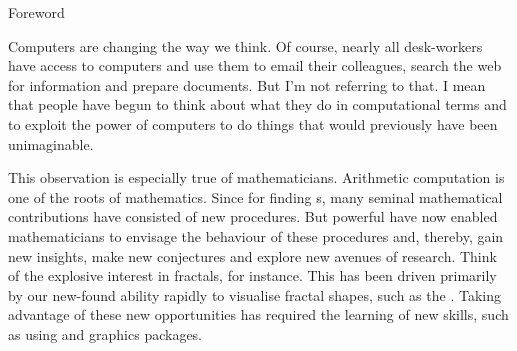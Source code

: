 
\begin{omgroup}{Foreword}

\begin{omtext}
Computers are changing the way we think. Of course, nearly all desk-workers have access to
computers and use them to email their colleagues, search the web for information and
prepare documents.  But I'm not referring to that. I mean that people have begun to think
about what they do in computational terms and to exploit the power of computers to do
things that would previously have been unimaginable.
\end{omtext}

\begin{omtext}
This observation is especially true of mathematicians. Arithmetic computation is one of
the roots of mathematics. Since {} for finding
{s}, many seminal mathematical contributions have
consisted of new procedures. But powerful {} have now enabled
mathematicians to envisage the behaviour of these procedures and, thereby, gain new
insights, make new conjectures and explore new avenues of research. Think of the explosive
interest in fractals, for instance.  This has been driven primarily by our new-found
ability rapidly to visualise fractal shapes, such as the {}.
Taking advantage of these new opportunities has required the learning of new skills, such
as using {} and graphics packages.
\end{omtext}


\end{omgroup}
